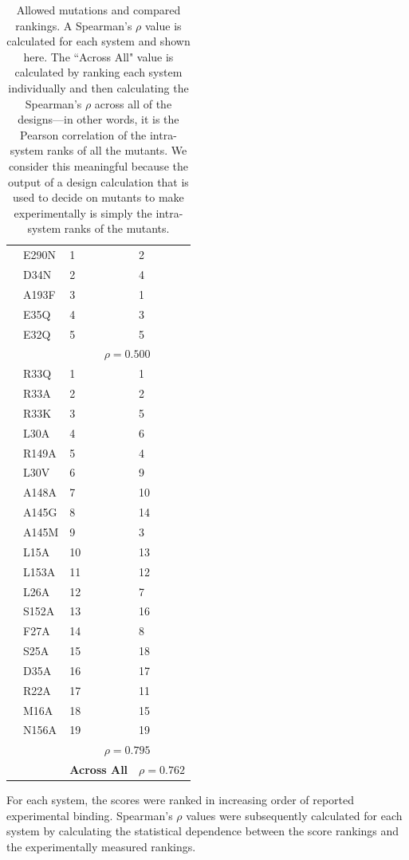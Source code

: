 \begin{table}[h!]
{\begin{tabular}{|K{1cm}|K{1.5cm}|K{1.5cm}|K{1.5cm}|}
 & E290N & 1 & 2\\
 & D34N & 2 & 4\\
 & A193F & 3 & 1\\
 & E35Q & 4 & 3\\ 
 & E32Q & 5 & 5\\ 
 &&  \\ 
\hline
\parbox[t]{2mm}{} & R33Q & 1 & 1\\
 & R33A & 2 & 2\\
 & R33K & 3 & 5\\
 & L30A & 4 & 6\\
 & R149A & 5 & 4\\
 & L30V & 6 & 9\\
 & A148A & 7 & 10\\
 & A145G & 8 & 14\\
 & A145M & 9 & 3\\
 & L15A & 10 & 13\\
 & L153A & 11 & 12\\
 & L26A & 12 & 7\\
 & S152A & 13 & 16\\
 & F27A & 14 & 8\\
 & S25A & 15 & 18\\
 & D35A & 16 & 17\\
 & R22A & 17 & 11\\
 & M16A & 18 & 15\\
 & N156A & 19 & 19\\ 
 &&  \\
 \hline
  & {\textbf{Across All}} & $\rho = 0.762$ \\
\hline
\end{tabular}
}
\caption{Allowed mutations and compared rankings. A Spearman's $\rho$ value is calculated for each system and shown here. The ``Across All" value is calculated by ranking each system individually and then calculating the Spearman's $\rho$ across all of the designs---in other words, it is the Pearson correlation of the intra-system ranks of all the mutants.  We consider this meaningful because the output of a design calculation that is used to decide on mutants to make experimentally is simply the intra-system ranks of the mutants.}
\label{table:spearman}
\end{table}

For each system, the \ks scores were ranked in increasing order of reported experimental binding. Spearman's $\rho$ values were subsequently calculated for each system by calculating the statistical dependence between the \ks score rankings and the experimentally measured rankings. 

